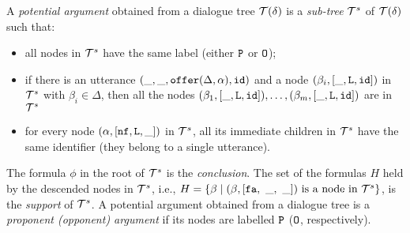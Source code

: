 
\begin{definition} \label{def:arg-t} A \emph{potential argument} obtained from a dialogue tree $\mathcal{T}(\delta)$ is a \emph{sub-tree} $\mathcal{T}^{s}$ of  $\mathcal{T}(\delta)$ such that:
\begin{itemize}
    \item all nodes in $\mathcal{T}^{s}$ have the same label (either $\texttt{\textup{P}}$ or $\texttt{\textup{O}}$);
    \item if there is an utterance $(\_ , \_ , \texttt{\textup{offer}}(\Delta, \alpha), \texttt{\textup{id}})$
        and a node $(\beta_i, [\_ , \texttt{\textup{L}} , \texttt{\textup{id}}])$ in $\mathcal{T}^{s}$ with $\beta_i \in \Delta$,
        then all the nodes
    $(\beta_1, [\_ , \texttt{\textup{L}} , \texttt{\textup{id}}]), \ldots, (\beta_m, [\_ , \texttt{\textup{L}} , \texttt{\textup{id}}])$ are in $\mathcal{T}^{s}$
    \item for every node $(\alpha, [\texttt{\textup{nf}}, \texttt{\textup{L}}, \_])$ in $\mathcal{T}^{s}$,
        all its immediate children in $\mathcal{T}^{s}$ have the same identifier (they belong to a single utterance).
\end{itemize}  
The formula $\phi$ in the root of $\mathcal{T}^{s}$ is the \emph{conclusion}. The set of the formulas $H$ held by the descended nodes in $\mathcal{T}^{s}$, i.e., $H = \{\beta \mid (\beta, [\texttt{\textup{fa}},\ \_,\ \_]) \text{ is a node in } \mathcal{T}^{s}\}$, is the \emph{support} of $\mathcal{T}^{s}$. %
A potential argument obtained from a dialogue tree is a \emph{proponent (opponent) argument} if its nodes are labelled $\texttt{\textup{P}}$ ($\texttt{\textup{O}}$, respectively). 
\end{definition}

